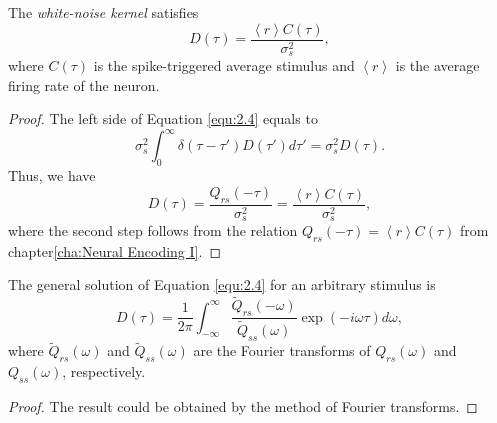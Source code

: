 \begin{prop}
  \label{prop:WhiteOptimalKernel}
  The \emph{white-noise kernel} satisfies
  \begin{equation}
    \label{equ:2.6}
    D(\tau) = \frac{\left<r\right>C(\tau)}{\sigma_s^2},
  \end{equation}
  where $C(\tau)$ is the spike-triggered average stimulus and $\left<r\right>$ is the average firing rate of the neuron.
\end{prop}
\begin{proof}
  The left side of Equation \ref{equ:2.4} equals to
  \begin{equation}
    \label{equ:2.5}
    \sigma_s^2\int_0^{\infty}\delta(\tau-\tau')D(\tau')d\tau' = \sigma_s^2D(\tau).
  \end{equation}
  Thus, we have
  \begin{equation}
    \label{equ:2.6}
    D(\tau) = \frac{Q_{rs}(-\tau)}{\sigma_s^2} = \frac{\left<r\right>C(\tau)}{\sigma_s^2},
  \end{equation}
  where the second step follows from the relation $Q_{rs}(-\tau) = \left<r\right>C(\tau)$ from chapter\ref{cha:Neural Encoding I}.
\end{proof}

\begin{prop}
  \label{prop:generalOptimalKernel}
  The general solution of Equation \ref{equ:2.4} for an arbitrary stimulus is
  \begin{equation}
    \label{equ:2.59}
    D(\tau) = \frac{1}{2\pi}\int_{-\infty}^{\infty}\frac{\tilde{Q}_{rs}(-\omega)}{\tilde{Q}_{ss}(\omega)}\exp\left(-i\omega\tau\right)d\omega,
  \end{equation}
  where $\tilde{Q}_{rs}(\omega)$ and $\tilde{Q}_{ss}(\omega)$ are the Fourier transforms of $Q_{rs}(\omega)$ and $Q_{ss}(\omega)$, respectively.
\end{prop}

\begin{proof}
  The result could be obtained by the method of Fourier transforms.
\end{proof}

